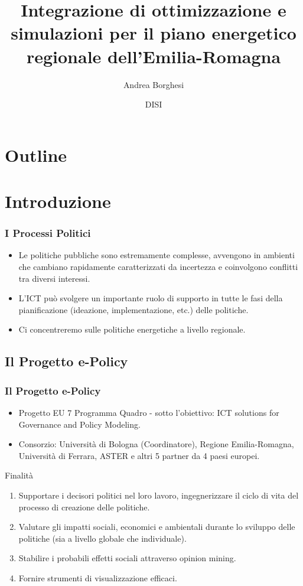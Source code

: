 \documentclass{beamer}
\author{Andrea Borghesi}
\title[Tesi LM-Ing.Inf. \hspace{25mm} \insertframenumber/\inserttotalframenumber]{Integrazione di ottimizzazione e simulazioni per il piano energetico regionale dell'Emilia-Romagna}
\date{DISI}
\begin{document}
	\begin{frame}
		\titlepage
	\end{frame}

\section*{Outline}
\begin{frame}
	\tableofcontents
\end{frame}


\section{Introduzione}

	\begin{frame}
		\frametitle{I Processi Politici}
		\begin{itemize}
		\item Le politiche pubbliche sono estremamente complesse, avvengono in ambienti che cambiano rapidamente caratterizzati da incertezza e coinvolgono conflitti tra diversi interessi.
		\item L'ICT può svolgere un importante ruolo di supporto in tutte le fasi della pianificazione (ideazione, implementazione, etc.) delle politiche.
		\item Ci concentreremo sulle politiche energetiche a livello regionale.
		\end{itemize}
 	\end{frame}
 	
\subsection{Il Progetto e-Policy}
	\begin{frame}
		\frametitle{Il Progetto e-Policy}
		\begin{itemize}
		\item Progetto EU 7 Programma Quadro - sotto l'obiettivo: ICT solutions for Governance and Policy Modeling.
		\item Consorzio: Università di Bologna (Coordinatore), Regione Emilia-Romagna, Università di Ferrara, ASTER e altri 5 partner da 4 paesi europei.
		\end{itemize}
		\begin{block}{Finalità}
			\begin{enumerate}
			\item Supportare i decisori politici nel loro lavoro, ingegnerizzare il ciclo di vita del processo di creazione delle politiche.
			\item Valutare gli impatti sociali, economici e ambientali durante lo sviluppo delle politiche (sia a livello globale che individuale).
			\item Stabilire i probabili effetti sociali attraverso opinion mining.
			\item Fornire strumenti di visualizzazione efficaci.
			\end{enumerate}
		\end{block}
 	\end{frame}
 	
\end{document}

